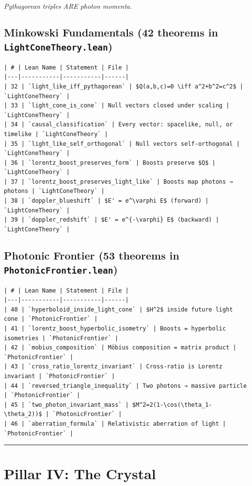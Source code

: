 \documentclass[12pt,a4paper,openany]{book}
\begin{document}
\textit{Pythagorean triples ARE photon momenta.}

\subsection{Minkowski Fundamentals (42 theorems in \texttt{LightConeTheory.lean})}

\begin{verbatim}
| # | Lean Name | Statement | File |
|---|-----------|-----------|------|
| 32 | `light_like_iff_pythagorean` | $Q(a,b,c)=0 \iff a^2+b^2=c^2$ | `LightConeTheory` |
| 33 | `light_cone_is_cone` | Null vectors closed under scaling | `LightConeTheory` |
| 34 | `causal_classification` | Every vector: spacelike, null, or timelike | `LightConeTheory` |
| 35 | `light_like_self_orthogonal` | Null vectors self-orthogonal | `LightConeTheory` |
| 36 | `lorentz_boost_preserves_form` | Boosts preserve $Q$ | `LightConeTheory` |
| 37 | `lorentz_boost_preserves_light_like` | Boosts map photons → photons | `LightConeTheory` |
| 38 | `doppler_blueshift` | $E' = e^\varphi E$ (forward) | `LightConeTheory` |
| 39 | `doppler_redshift` | $E' = e^{-\varphi} E$ (backward) | `LightConeTheory` |
\end{verbatim}

\subsection{Photonic Frontier (53 theorems in \texttt{PhotonicFrontier.lean})}

\begin{verbatim}
| # | Lean Name | Statement | File |
|---|-----------|-----------|------|
| 40 | `hyperboloid_inside_light_cone` | $H^2$ inside future light cone | `PhotonicFrontier` |
| 41 | `lorentz_boost_hyperbolic_isometry` | Boosts = hyperbolic isometries | `PhotonicFrontier` |
| 42 | `mobius_composition` | Möbius composition = matrix product | `PhotonicFrontier` |
| 43 | `cross_ratio_lorentz_invariant` | Cross-ratio is Lorentz invariant | `PhotonicFrontier` |
| 44 | `reversed_triangle_inequality` | Two photons → massive particle | `PhotonicFrontier` |
| 45 | `two_photon_invariant_mass` | $M^2=2(1-\cos(\theta_1-\theta_2))$ | `PhotonicFrontier` |
| 46 | `aberration_formula` | Relativistic aberration of light | `PhotonicFrontier` |
\end{verbatim}

\bigskip\hrule\bigskip

\section{Pillar IV: The Crystal}
\end{document}
